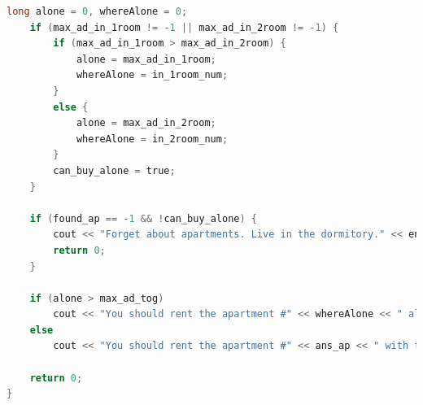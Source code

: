 \documentclass[a4paper,12pt]{article}
\begin{document}
\begin{lstlisting}[language=C]
    long alone = 0, whereAlone = 0;
    if (max_ad_in_1room != -1 || max_ad_in_2room != -1) {
        if (max_ad_in_1room > max_ad_in_2room) {
            alone = max_ad_in_1room;
            whereAlone = in_1room_num;
        }
        else {
            alone = max_ad_in_2room;
            whereAlone = in_2room_num;
        }
        can_buy_alone = true;
    }
    
    if (found_ap == -1 && !can_buy_alone) {
        cout << "Forget about apartments. Live in the dormitory." << endl;
        return 0;
    }
    
    if (alone > max_ad_tog)
        cout << "You should rent the apartment #" << whereAlone << " alone." << endl;
    else
        cout << "You should rent the apartment #" << ans_ap << " with the friend #" << ans_fr << "." << endl;
        
    return 0;
}
\end{lstlisting}
\end{document}
